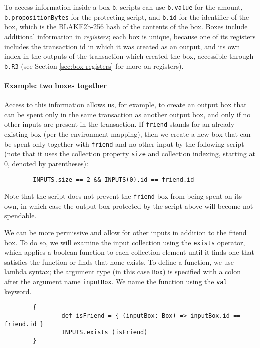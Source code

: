 \documentclass[11pt]{article}
\begin{document}
To access information inside a box \texttt{b}, scripts can use \texttt{b.value} for the amount, \texttt{b.propositionBytes} for the protecting script, and \texttt{b.id} for the identifier of the box, which is the BLAKE2b-256 hash of the contents of the box. Boxes include additional information in \emph{registers};  each box is unique, because one of its registers includes the transaction id in which it was created as an output, and its own index in the outputs of the transaction which created the box, accessible through \texttt{b.R3} (see Section \ref{sec:box-registers} for more on registers).

\paragraph{Example: two boxes together}
Access to this information allows us, for example, to create an output box that can be spent only in the same transaction as another output box, and only if no other inputs are present in the transaction. If \texttt{friend} stands for an already existing box (per the environment mapping), then we create a new box that can be spent only together with \texttt{friend} and no other input by the following script (note that it uses the collection property \texttt{size} and collection indexing, starting at 0, denoted by parentheses):

\begin{verbatim}
        INPUTS.size == 2 && INPUTS(0).id == friend.id
\end{verbatim}

Note that the script does not prevent the \texttt{friend} box from being spent on its own, in which case the output box protected by the script above will become not spendable.

We can be more permissive and allow for other inputs in addition to the friend box. To do so, we will examine the input collection using the \texttt{exists} operator, which applies a boolean function to each collection element until it finds one that satisfies the function or finds that none exists. To define a function, we use lambda syntax; the argument type (in this case \texttt{Box}) is specified with a colon after the argument name \texttt{inputBox}. We name the function using the \texttt{val} keyword.
\begin{verbatim}
        {
                def isFriend = { (inputBox: Box) => inputBox.id == friend.id }
                INPUTS.exists (isFriend)
        }
\end{verbatim}
\end{document}
